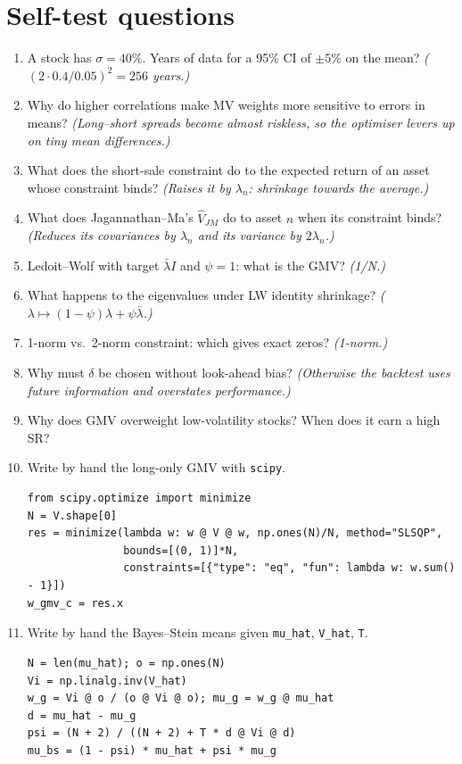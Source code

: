 \documentclass[11pt,a4paper]{report}
\begin{document}
\section{Self-test questions}
\begin{enumerate}
  \item A stock has $\sigma=40\%$. Years of data for a 95\% CI of $\pm5\%$ on the mean?
    \emph{($(2\cdot0.4/0.05)^2=256$ years.)}
  \item Why do higher correlations make MV weights more sensitive to errors in means?
    \emph{(Long--short spreads become almost riskless, so the optimiser levers up on tiny mean differences.)}
  \item What does the short-sale constraint do to the expected return of an asset whose constraint binds?
    \emph{(Raises it by $\lambda_n$: shrinkage towards the average.)}
  \item What does Jagannathan--Ma's $\hat V_{JM}$ do to asset $n$ when its constraint binds?
    \emph{(Reduces its covariances by $\lambda_n$ and its variance by $2\lambda_n$.)}
  \item Ledoit--Wolf with target $\bar\lambda I$ and $\psi=1$: what is the GMV? \emph{(1/N.)}
  \item What happens to the eigenvalues under LW identity shrinkage? \emph{($\lambda\mapsto(1-\psi)\lambda+\psi\bar\lambda$.)}
  \item 1-norm vs.\ 2-norm constraint: which gives exact zeros? \emph{(1-norm.)}
  \item Why must $\delta$ be chosen without look-ahead bias? \emph{(Otherwise the
    backtest uses future information and overstates performance.)}
  \item Why does GMV overweight low-volatility stocks? When does it earn a high SR?
  \item Write by hand the long-only GMV with \texttt{scipy}.
\begin{lstlisting}
from scipy.optimize import minimize
N = V.shape[0]
res = minimize(lambda w: w @ V @ w, np.ones(N)/N, method="SLSQP",
               bounds=[(0, 1)]*N,
               constraints=[{"type": "eq", "fun": lambda w: w.sum() - 1}])
w_gmv_c = res.x
\end{lstlisting}
  \item Write by hand the Bayes--Stein means given \texttt{mu\_hat}, \texttt{V\_hat}, \texttt{T}.
\begin{lstlisting}
N = len(mu_hat); o = np.ones(N)
Vi = np.linalg.inv(V_hat)
w_g = Vi @ o / (o @ Vi @ o); mu_g = w_g @ mu_hat
d = mu_hat - mu_g
psi = (N + 2) / ((N + 2) + T * d @ Vi @ d)
mu_bs = (1 - psi) * mu_hat + psi * mu_g
\end{lstlisting}
\end{enumerate}
\end{document}
